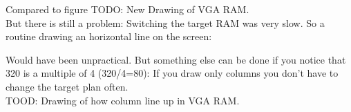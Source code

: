 \documentclass[book.tex]{subfiles}
\begin{document}
Compared to figure 
TODO: New Drawing of VGA RAM.\\
But there is still a problem: Switching the target RAM was very slow. So a routine drawing an horizontal line on the screen:\\
\par
\begin{minipage}{\textwidth}

\end{minipage}
Would have been unpractical. But something else can be done if you notice that 320 is a multiple of 4 (320/4=80): If you draw only columns you don't have to change the target plan often.\\
TOOD: Drawing of how column line up in VGA RAM.\\

 \par
\end{document}
